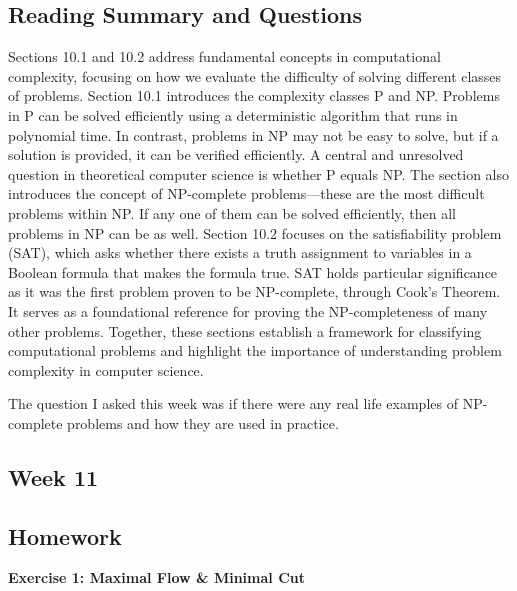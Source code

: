\documentclass{article}
\theoremstyle{theorem}
\theoremstyle{definition}
\theoremstyle{remark}
\begin{document}
\subsection*{Reading Summary and Questions}
Sections 10.1 and 10.2 address fundamental concepts in computational complexity, focusing on how we evaluate 
the difficulty of solving different classes of problems. Section 10.1 introduces the complexity classes P and NP. 
Problems in P can be solved efficiently using a deterministic algorithm that runs in polynomial time. In contrast, 
problems in NP may not be easy to solve, but if a solution is provided, it can be verified efficiently. A central 
and unresolved question in theoretical computer science is whether P equals NP. The section also introduces the 
concept of NP-complete problems—these are the most difficult problems within NP. If any one of them can be solved 
efficiently, then all problems in NP can be as well. Section 10.2 focuses on the satisfiability problem (SAT), which 
asks whether there exists a truth assignment to variables in a Boolean formula that makes the formula true. SAT 
holds particular significance as it was the first problem proven to be NP-complete, through Cook’s Theorem. It serves 
as a foundational reference for proving the NP-completeness of many other problems. Together, these sections establish 
a framework for classifying computational problems and highlight the importance of understanding problem complexity 
in computer science.

The question I asked this week was if there were any real life examples of NP-complete problems and how they are used in practice.

\subsection*{Week 11}
\smallskip

\subsection*{Homework}
\textbf{Exercise 1: Maximal Flow \& Minimal Cut}
\end{document}
